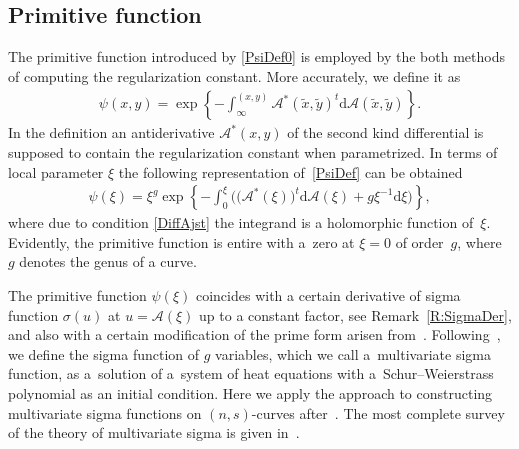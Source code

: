 \documentclass[pdftex]{sigma}
\numberwithin{equation}{section}
\newcommand{\rmd}{\mathrm{d}}
\begin{document}
\subsection{Primitive function}
The primitive function introduced by \eqref{PsiDef0} is employed by the both methods of computing the regularization constant. More accurately, we define it as
\begin{gather}\label{PsiDef}
 \psi(x,y) = \exp\left\{-\int_{\infty}^{(x,y)} \mathcal{A}^\ast(\tilde{x},\tilde{y})^{t} \rmd \mathcal{A}(\tilde{x},\tilde{y}) \right\}.
\end{gather}
In the definition an antiderivative $\mathcal{A}^\ast(x,y)$ of the second kind differential is supposed to contain the regularization constant when parametrized. In terms of local parameter $\xi$ the following representation of~\eqref{PsiDef} can be obtained
\begin{gather*}%
\psi(\xi) = \xi^g \exp \left\{-\int_0^{\xi} \big(\big(\mathcal{A}^\ast(\xi)\big)^t \rmd \mathcal{A}(\xi) + g \xi^{-1}\rmd\xi \big)\right\},
\end{gather*}
where due to condition \eqref{DiffAjst} the integrand is a holomorphic function of~$\xi$. Evidently, the primitive function is entire with a~zero at $\xi=0$ of order~$g$, where~$g$ denotes the genus of a curve.

The primitive function $\psi(\xi)$ coincides with a certain derivative of sigma function $\sigma(u)$ at $u= \mathcal{A}(\xi)$ up to a constant factor, see Remark~\ref{R:SigmaDer}, and also with a certain modification of the prime form arisen from~\cite{N2010}. Following~\cite{BL2004}, we define the sigma function of $g$ variables, which we call a~multivariate sigma function, as a~solution of a~system of heat equations with a~Schur--Weierstrass polynomial as an initial condition. Here we apply the approach to constructing multivariate sigma functions on $(n,s)$-curves after~\cite{BL2004,BL2008}. The most complete survey of the theory of multivariate sigma is given in~\cite{BEL2012}.
\end{document}
